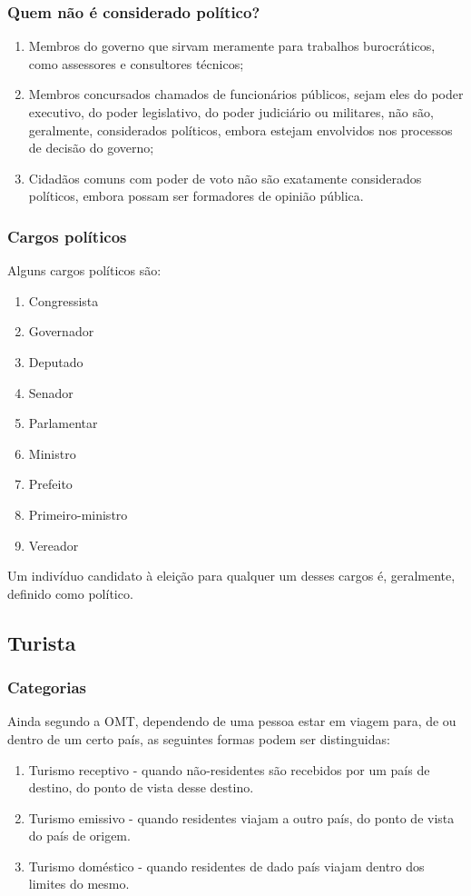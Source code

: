 \documentclass[a4paper,10pt]{article}
\begin{document}
\subsubsection{Quem não é considerado político?}
\begin{enumerate}
\item Membros do governo que sirvam meramente para trabalhos burocráticos, como assessores e consultores técnicos;
\item Membros concursados chamados de funcionários públicos, sejam eles do poder executivo, do poder legislativo, do poder judiciário ou militares, não são, geralmente, considerados políticos, embora estejam envolvidos nos processos de decisão do governo;
\item Cidadãos comuns com poder de voto não são exatamente considerados políticos, embora possam ser formadores de opinião pública.
\end{enumerate}

\subsubsection{Cargos políticos}
Alguns cargos políticos são:
\begin{enumerate}
\item Congressista
\item Governador
\item Deputado
\item Senador
\item Parlamentar
\item Ministro
\item Prefeito
\item Primeiro-ministro
\item Vereador
\end{enumerate}
Um indivíduo candidato à eleição para qualquer um desses cargos é, geralmente, definido como político.

\subsection{Turista}
\subsubsection{Categorias}
Ainda segundo a OMT, dependendo de uma pessoa estar em viagem para, de ou dentro de um certo país, as seguintes formas podem ser distinguidas:
\begin{enumerate}
\item Turismo receptivo - quando não-residentes são recebidos por um país de destino, do ponto de vista desse destino.
\item Turismo emissivo - quando residentes viajam a outro país, do ponto de vista do país de origem.
\item Turismo doméstico - quando residentes de dado país viajam dentro dos limites do mesmo.
\end{enumerate}
\end{document}
